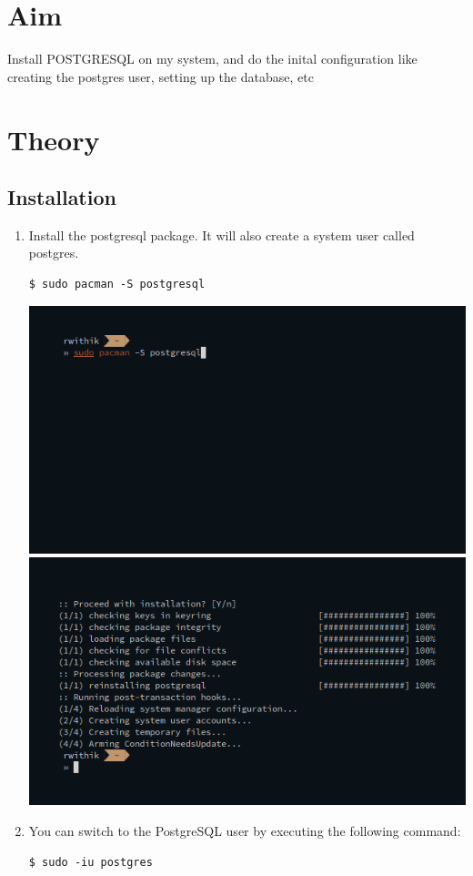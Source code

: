 \section{Aim}
 Install POSTGRESQL on my system, and do the inital configuration like creating the postgres user, setting up the database, etc

\section{{Theory}}

\subsection{Installation}

\begin{enumerate}
\item Install the postgresql package. It will also create a system user called postgres.
\begin{verbatim}
$ sudo pacman -S postgresql
\end{verbatim}
\includegraphics[width=\linewidth]{../Images/Installation/1.png}\newline
\includegraphics[width=\linewidth]{../Images/Installation/2.png}\newline
\item You can switch to the PostgreSQL user by executing the following command:
\begin{verbatim}
$ sudo -iu postgres
\end{verbatim}
\end{enumerate}

